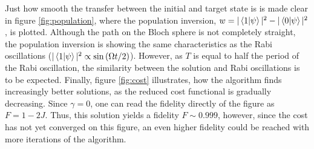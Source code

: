 Just how smooth the transfer between the initial and target state is is made clear in figure \ref{fig:population}, where the population inversion, $w = |\braket{1|\psi}|^2 - |\braket{0|\psi}|^2$, is plotted. Although the path on the Bloch sphere is not completely straight, the population inversion is showing the same characteristics as the Rabi oscillations ($|\braket{1|\psi}|^2 \propto \sin \left( \Omega t / 2 \right)$). However, as $T$ is equal to half the period of the Rabi oscillation, the similarity between the solution and Rabi oscillations is to be expected.
Finally, figure \ref{fig:cost} illustrates, how the algorithm finds increasingly better solutions, as the reduced cost functional is gradually decreasing. Since $\gamma = 0$, one can read the fidelity directly of the figure as $F = 1 - 2 J$. Thus, this solution yields a fidelity $F \sim 0.999$, however, since the cost has not yet converged on this figure, an even higher fidelity could be reached with more iterations of the algorithm. 


